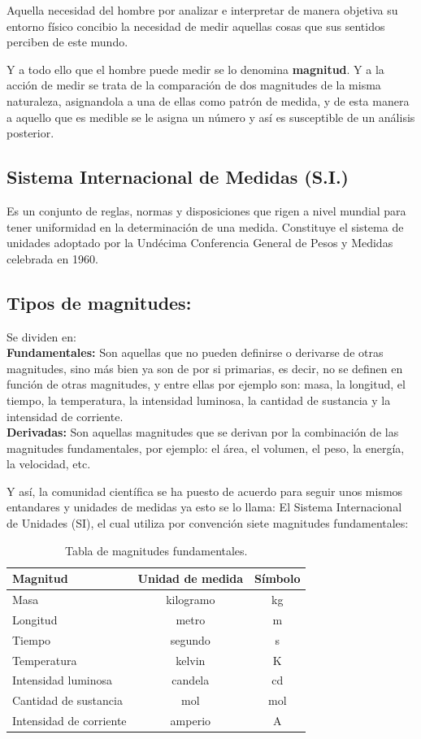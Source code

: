 \documentclass[a5paper,pagesize,10pt,bibtotoc,pointlessnumbers,
normalheadings,DIV=9,fleqn,x11names,table,twoside=false]{scrbook}
\begin{document}
Aquella necesidad del hombre por analizar e interpretar de manera objetiva su entorno físico concibio la necesidad de medir 
aquellas cosas que sus sentidos perciben de este mundo.

Y a todo ello que el hombre puede medir se lo denomina \textbf{magnitud}. Y a la acción de medir se trata de la comparación de dos 
magnitudes de la misma naturaleza, asignandola a una de ellas como patrón de medida, y de esta manera a aquello que es medible se 
le asigna un número y así es susceptible de un análisis posterior.

\subsection{Sistema Internacional de Medidas (S.I.)}

Es un conjunto de reglas, normas y disposiciones que rigen a nivel mundial para tener uniformidad en la determinación de una 
medida. Constituye el sistema de unidades adoptado por la Undécima Conferencia General de Pesos y Medidas celebrada en 1960. 

\subsection{Tipos de magnitudes:}

Se dividen en:\\

\textbf{Fundamentales:} Son aquellas que no pueden definirse o derivarse de otras magnitudes, sino más bien ya son de por si 
primarias, es decir, no se definen en función de otras magnitudes, y entre ellas por ejemplo son: masa, la longitud, el tiempo, la 
temperatura, la intensidad luminosa, la cantidad de sustancia y la intensidad de corriente.\\

\textbf{Derivadas:} Son aquellas magnitudes que se derivan por la combinación de las magnitudes fundamentales, por ejemplo: el 
área, el volumen, el peso, la energía, la velocidad, etc.

Y así, la comunidad científica se ha puesto de acuerdo para seguir unos mismos entandares y unidades de medidas ya esto se lo 
llama: El Sistema Internacional de Unidades (SI), el cual utiliza por convención siete magnitudes fundamentales: 

\begin{table}[h]
\centering
\begin{tabular}{lcc}
\hline
Magnitud & Unidad de medida & Símbolo\\
\hline
Masa & kilogramo & kg \\
Longitud & metro & m\\
Tiempo & segundo & s\\
Temperatura & kelvin & K\\
Intensidad luminosa & candela & cd\\
Cantidad de sustancia & mol & mol\\
Intensidad de corriente & amperio & A\\
\hline
\end{tabular}
\caption{Tabla de magnitudes fundamentales.} 
\end{table}
\end{document}
